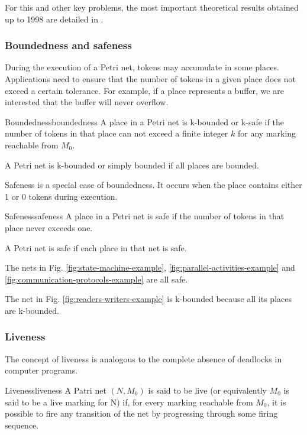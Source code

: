 For this and other key problems, the most important theoretical results
obtained up to 1998 are detailed in \cite{esparza1994decidability}.

\subsubsection{Boundedness and safeness}

During the execution of a Petri net, tokens may accumulate in some places.
Applications need to ensure that the number of tokens in a given place does not
exceed a certain tolerance.
For example, if a place represents a buffer,
we are interested that the buffer will never overflow.

\begin{definition}{Boundedness}{boundedness}
    A place in a Petri net is k-bounded or k-safe
    if the number of tokens in that place can not exceed a finite integer $k$
    for any marking reachable from $M_0$.

    A Petri net is k-bounded or simply bounded if all places are bounded.
\end{definition}

Safeness is a special case of boundedness.
It occurs when the place contains either 1 or 0 tokens during execution.

\begin{definition}{Safeness}{safeness}
    A place in a Petri net is safe if the number of tokens in that place never exceeds one.

    A Petri net is safe if each place in that net is safe.
\end{definition}

The nets in Fig. \ref{fig:state-machine-example}, \ref{fig:parallel-activities-example}
and \ref{fig:communication-protocols-example} are all safe.

The net in Fig. \ref{fig:readers-writers-example} is k-bounded because all its places are k-bounded.

\subsubsection{Liveness}

The concept of liveness is analogous to the complete absence of deadlocks in computer programs.

\begin{definition}{Liveness}{liveness}
    A Patri net $(N, M_0)$ is said to be live
    (or equivalently $M_0$ is said to be a live marking for N) if,
    for every marking reachable from $M_0$, it is possible to fire any transition
    of the net by progressing through some firing sequence.
\end{definition}

